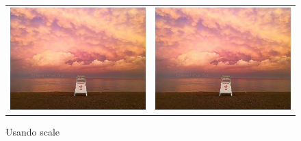 \documentclass{article}
\begin{document}
\begin{figure}[h]
\centering
\begin{tabular}{cc} 
\includegraphics[scale=0.05]{lago}& 
\includegraphics[scale=0.15]{lago} 
\end{tabular} 
\caption{Usando scale} 
\end{figure}
\end{document}
